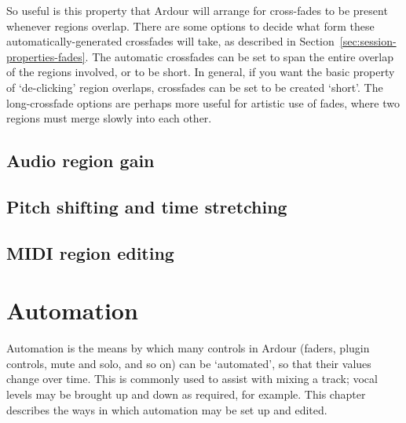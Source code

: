 \documentclass[10pt,a4paper]{book}
\begin{document}
{So useful is this property that Ardour will arrange for cross-fades to
be present whenever regions overlap.  There are some options to decide
what form these automatically-generated crossfades will take, as
described in Section~\ref{sec:session-properties-fades}.  The
automatic crossfades can be set to span the entire overlap of the
regions involved, or to be short.  In general, if you want the basic
property of `de-clicking' region overlaps, crossfades can be set to be
created `short'.  The long-crossfade options are perhaps more useful for
artistic use of fades, where two regions must merge slowly into each
other.




\section{Audio region gain}

\section{Pitch shifting and time stretching}

\section{MIDI region editing}






\chapter{Automation}
\label{ch:automation}

Automation is the means by which many controls in Ardour (faders,
plugin controls, mute and solo, and so on) can be `automated', so that
their values change over time.  This is commonly used to assist with
mixing a track; vocal levels may be brought up and down as required,
for example.  This chapter describes the ways in which automation may
be set up and edited.





}
\end{document}
